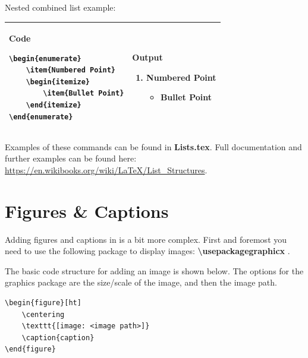 \documentclass[10pt, titlepage]{article}
\begin{document}
Nested combined list example:\\
\begin{tabular}{|p{240pt}|p{240pt}|}\hline
\textbf{Code}\newline
\begin{lstlisting}
\begin{enumerate}
	\item{Numbered Point}
	\begin{itemize}
		\item{Bullet Point}
	\end{itemize}
\end{enumerate}
\end{lstlisting} &
\textbf{Output}\newline
\begin{enumerate}
	\item{Numbered Point}
	\begin{itemize}
		\item{Bullet Point}
	\end{itemize}
\end{enumerate} \\\hline
\end{tabular}

Examples of these commands can be found in \textbf{Lists.tex}. Full documentation and further examples can be found here: \url{https://en.wikibooks.org/wiki/LaTeX/List_Structures}.

\section{Figures \& Captions}
Adding figures and captions in is a bit more complex. First and foremost you need to use the following package to display images: \textbf{\textbackslash usepackage{graphicx} }.

The basic code structure for adding an image is shown below. The options for the graphics package are the size/scale of the image, and then the image path. 

\begin{lstlisting}
\begin{figure}[ht]
	\centering
	\texttt{[image: <image path>]}
	\caption{caption}
\end{figure}
\end{lstlisting}
\end{document}

